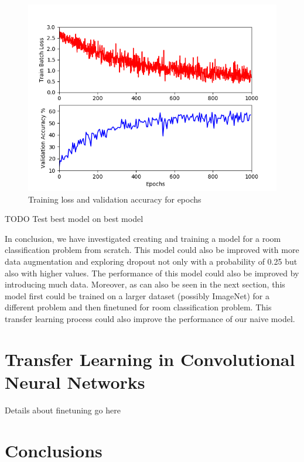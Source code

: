 \documentclass{article}
\begin{document}
\begin{figure}
  \includegraphics[width=\linewidth]{myTrainingProcess.png}
  \caption{Training loss and validation accuracy for epochs}
  \label{fig:myTrainingProcess}
\end{figure}

TODO
Test best model on best model

In conclusion, we have investigated creating and training a model for a room classification problem from scratch. This model could also be improved with more data augmentation and exploring dropout not only with a probability of 0.25 but also with higher values. The performance of this model could also be improved by introducing much data. Moreover, as can also be seen in the next section, this model first could be trained on a larger dataset (possibly ImageNet) for a different problem and then finetuned for room classification problem. This transfer learning process could also improve the performance of our naive model.

\section{Transfer Learning in Convolutional Neural Networks}

Details about finetuning go here 


\section{Conclusions}
 
{\small


}
\end{document}
